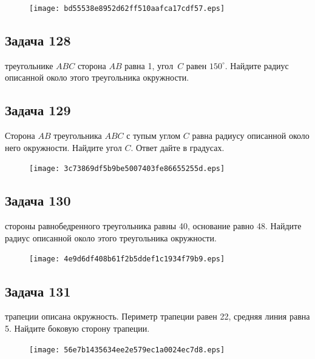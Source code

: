 \documentclass[a4paper,10pt]{article} %
\begin{document}
\begin{spacing}{1.0}
{\vspace{1.5cm}

\begin{figure}{\texttt{[image: bd55538e8952d62ff510aafca17cdf57.eps]}}\end{figure}
\subsection*{Задача 128}
 треугольнике $ABC$ сторона $AB$ равна 1, угол~$C$ равен $150^\circ$. Найдите радиус описанной около этого треугольника окружности.

\vspace{1.5cm}

\subsection*{Задача 129}
Сторона $AB$ треугольника $ABC$ с тупым углом $C$ равна радиусу описанной около него окружности. Найдите угол $C$. Ответ дайте в градусах.

\vspace{1.5cm}

\begin{figure}{\texttt{[image: 3c73869df5b9be5007403fe86655255d.eps]}}\end{figure}
\subsection*{Задача 130}
 стороны равнобедренного треугольника равны 40, основание равно 48. Найдите радиус описанной около этого треугольника окружности.

\vspace{1.5cm}

\begin{figure}{\texttt{[image: 4e9d6df408b61f2b5ddef1c1934f79b9.eps]}}\end{figure}
\subsection*{Задача 131}
 трапеции описана окружность. Периметр трапеции равен 22, средняя линия равна 5. Найдите боковую сторону трапеции.

\vspace{1.5cm}

\begin{figure}{\texttt{[image: 56e7b1435634ee2e579ec1a0024ec7d8.eps]}}\end{figure}
}
\end{spacing}
\end{document}
